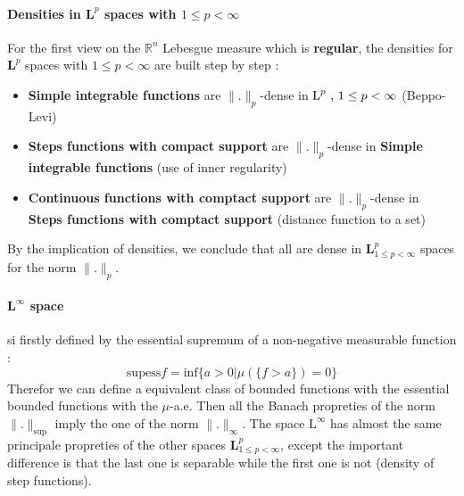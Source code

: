 \documentclass[a4paper,10pt]{article}
\begin{document}
\paragraph{Densities in $\textbf{L}^p$ spaces with $1 \leq p < \infty$}
For the first view on the $\mathbb{R}^n$ Lebesgue measure which is \textbf{regular}, the densities for $\textbf{L}^p$ spaces with $1 \leq p < \infty$ are built step by step :
\begin{itemize}
 \item \textbf{Simple integrable functions} are $\|.\|_p$-dense in $\text{L}^p \hbox{ , } 1 \leq p < \infty$ (Beppo-Levi)
 \item \textbf{Steps functions with compact support} are $\|.\|_p$-dense in \textbf{Simple integrable functions} (use of inner regularity)
 \item \textbf{Continuous functions with comptact support} are $\|.\|_p$-dense in \textbf{Steps functions with comptact support} (distance function to a set)
\end{itemize}
By the implication of densities, we conclude that all are dense in $\textbf{L}^p_{1 \leq p < \infty}$ spaces for the norm $\|.\|_p$.
 

\paragraph{$\textbf{L}^{\infty}$ space} si firstly defined by the essential supremum of a non-negative measurable function  :
\[
\text{supess} f = \text{inf} \{a > 0 | \mu(\{ f>a \}) = 0 \}
\]
Therefor we can define a equivalent class of bounded functions with the essential bounded functions with the $\mu$-a.e. Then all the Banach propreties of the norm $\|.\|_{\text{sup}}$ imply the one of the norm $\|.\|_{\infty}$. The space $\text{L}^{\infty}$ has almost the same principale propreties of the other spaces $\textbf{L}^p_{1 \leq p < \infty}$, except the important difference is that the last one is separable while the first one is not (density of step functions).
\end{document}
